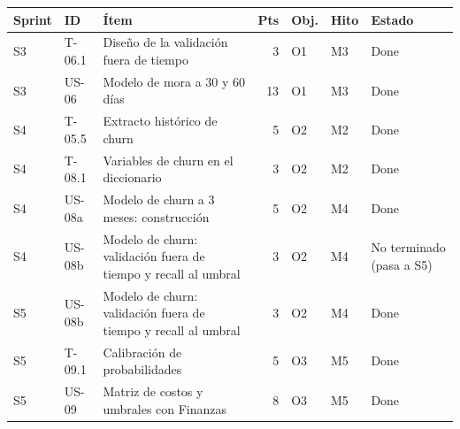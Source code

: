 \footnotesize
\begin{tabularx}{\linewidth}{l l X r l l l}
\toprule
\textbf{Sprint} & \textbf{ID} & \textbf{Ítem} & \textbf{Pts} & \textbf{Obj.} & \textbf{Hito} & \textbf{Estado} \\
\midrule
S3 & T-06.1 & Diseño de la validación fuera de tiempo & 3 & O1 & M3 & Done \\
S3 & US-06 & Modelo de mora a 30 y 60 días & 13 & O1 & M3 & Done \\
S4 & T-05.5 & Extracto histórico de churn & 5 & O2 & M2 & Done \\
S4 & T-08.1 & Variables de churn en el diccionario & 3 & O2 & M2 & Done \\
S4 & US-08a & Modelo de churn a 3 meses: construcción & 5 & O2 & M4 & Done \\
S4 & US-08b & Modelo de churn: validación fuera de tiempo y recall al umbral & 3 & O2 & M4 & No terminado (pasa a S5) \\
S5 & US-08b & Modelo de churn: validación fuera de tiempo y recall al umbral & 3 & O2 & M4 & Done \\
S5 & T-09.1 & Calibración de probabilidades & 5 & O3 & M5 & Done \\
S5 & US-09 & Matriz de costos y umbrales con Finanzas & 8 & O3 & M5 & Done \\
\bottomrule
\end{tabularx}
